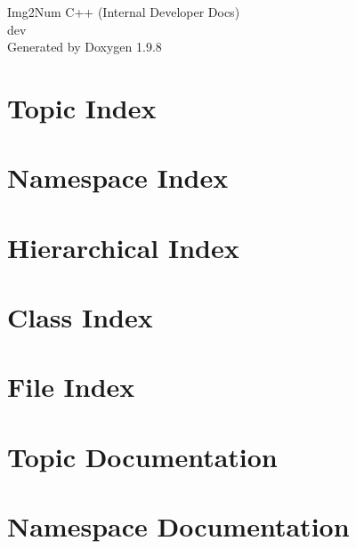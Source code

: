 \documentclass[twoside]{book}
\newcommand{\+}{\discretionary{\mbox{\scriptsize$\hookleftarrow$}}{}{}}
\newcommand{\clearemptydoublepage}{%
    \newpage{\pagestyle{empty}\cleardoublepage}%
  }
\begin{document}
  \raggedbottom
    \hypersetup{pageanchor=false,
                bookmarksnumbered=true,
                pdfencoding=unicode
               }
  \begin{titlepage}
  \vspace*{7cm}
  \begin{center}%
  {\Large Img2\+Num C++ (\+Internal Developer Docs)}\\
  [1ex]\large dev \\
  \vspace*{1cm}
  {\large Generated by Doxygen 1.9.8}\\
  \end{center}
  \end{titlepage}
  \clearemptydoublepage
  \tableofcontents
  \clearemptydoublepage
  \hypersetup{pageanchor=true}

\chapter{Topic Index}

\chapter{Namespace Index}

\chapter{Hierarchical Index}

\chapter{Class Index}

\chapter{File Index}

\chapter{Topic Documentation}

\chapter{Namespace Documentation}

\end{document}
